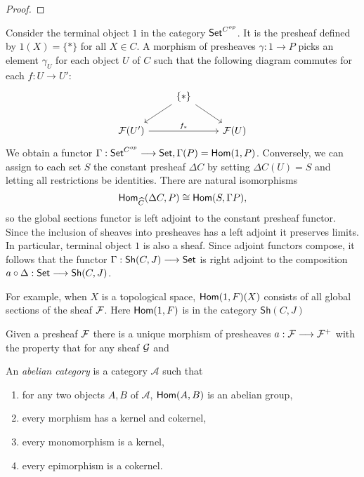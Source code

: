 \begin{proof}
\end{proof}

Consider the terminal object $1$ in the category $\mathsf{Set}^{C^{op}}$. It is the presheaf defined by $1(X) = \{*\}$ for all $X \in C$. A morphism of presheaves $\gamma: 1 \to P$ picks an element $\gamma_U$ for each object $U$ of $C$ such that the following diagram commutes for each $f: U \to U'$:
\[ \begin{tikzcd}
	& {\{*\}} \\
	{\Sh{F}(U')} && {\Sh{F}(U)}
	\arrow[from=1-2, to=2-1]
	\arrow["{f_*}", from=2-1, to=2-3]
	\arrow[from=1-2, to=2-3]
\end{tikzcd}
\]
We obtain a functor $\Gamma: \mathsf{Set}^{C^{op}} \longrightarrow \mathsf{Set}, \Gamma(P) = \mathsf{Hom}(1, P)$. Conversely, we can assign to each set $S$ the constant presheaf $\Delta C$ by setting $\Delta C(U) = S$ and letting all restrictions be identities. There are natural isomorphisms
\[\mathsf{Hom}_{\widehat{C}}(\Delta C, P) \cong \mathsf{Hom}(S, \Gamma P),\]
so the global sections functor is left adjoint to the constant presheaf functor.
Since the inclusion of sheaves into presheaves has a left adjoint it preserves limits. In particular, terminal object $1$ is also a sheaf. Since adjoint functors compose, it follows that the functor $\Gamma : \mathsf{Sh}(C,J) \longrightarrow \mathsf{Set}$ is right adjoint to the composition $a \circ \Delta: \mathsf{Set} \longrightarrow \mathsf{Sh}(C,J)$. 


For example, when $X$ is a topological space, $\mathsf{Hom}(1,F)(X)$ consists of all global sections of the sheaf $\mathcal{F}$. Here $\mathsf{Hom}(1,F)$ is in the category $\mathsf{Sh}(C,J)$


\begin{theorem}
  Given a presheaf $\mathcal{F}$ there is a unique morphism of presheaves $a : \mathcal{F} \longrightarrow \mathcal{F}^{+}$ with the property that for any sheaf $\mathcal{G}$ and 
\end{theorem}

\begin{remark}
	An \textit{abelian category} is a category $\mathcal{A}$ such that
	\begin{enumerate}
		\item for any two objects $A,B$ of $\mathcal{A}$, $\mathsf{Hom}(A,B)$ is an abelian group,
		\item every morphism has a kernel and cokernel,
		\item every monomorphism is a kernel,
		\item every epimorphism is a cokernel.
	\end{enumerate}
\end{remark}

